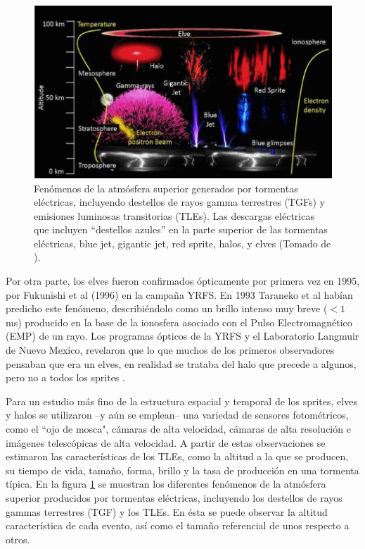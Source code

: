 \documentclass[12pt,oneside,openany,letter]{book}
\begin{document}
\begin{figure}
    \centering
    \includegraphics[scale=0.75]{figures/tle_and_tgf.png}
    \caption[Fenómenos de la atmósfera superior generados por tormentas eléctricas]{Fenómenos de la atmósfera superior generados por tormentas eléctricas, incluyendo destellos de rayos gamma terrestres (TGFs) y emisiones luminosas transitorias (TLEs). Las descargas eléctricas que incluyen ``destellos azules'' en la parte superior de las tormentas eléctricas, blue jet, gigantic jet, red sprite, halos, y elves (Tomado de \cite{Gaskill2018}).}
    \label{fig:tle_and_tgf}
\end{figure}

Por otra parte, los elves fueron confirmados ópticamente por primera vez en 1995, por Fukunishi et al (1996) en la campaña YRFS. En 1993 Taraneko et al habían predicho este fenómeno, describiéndolo como un brillo intenso muy breve ($<1$ms) producido en la base de la ionosfera asociado con el Pulso Electromagnético (EMP) de un rayo. Los programas ópticos de la YRFS y el Laboratorio Langmuir de Nuevo Mexico, revelaron que lo que muchos de los primeros observadores pensaban que era un elves, en realidad se trataba del halo que precede a algunos, pero no a todos los sprites \cite{FullekrugEtal2006}. 

Para un estudio más fino de la estructura espacial y temporal de los sprites, elves y halos se utilizaron --y aún se emplean-- una variedad de sensores fotométricos, como el ``ojo de mosca", cámaras de alta velocidad, cámaras de alta resolución e imágenes telescópicas de alta velocidad\cite{FullekrugEtal2006}. A partir de estas observaciones se estimaron las características de los TLEs, como la altitud a la que se producen, su tiempo de vida, tamaño, forma, brillo y la tasa de producción en una tormenta típica. En la figura \ref{fig:tle_and_tgf} se muestran los diferentes fenómenos de la atmósfera superior producidos por tormentas eléctricas, incluyendo los destellos de rayos gammas terrestres (TGF) y los TLEs. En ésta se puede observar la altitud característica de cada evento, así como el tamaño referencial de unos respecto a otros. 
\end{document}
